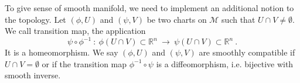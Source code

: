 \documentclass[10pt]{book}
\newcommand{\Mcal}{\mathcal{M}}
\newcommand{\Rbb}{\mathbb{R}}
\theoremstyle{break}
\begin{document}
%
%
%
%
%
%
%
%
%
%
%
%
%
%
%
%
%
%
\bigskip


To give sense of smooth manifold, we need to implement an additional notion to the topology. Let $(\phi,U)$ and $(\psi,V)$ be two charts on $\Mcal$ such that $U \cap V \neq \emptyset$. We call transition map, the application
%
\begin{equation*}
\psi \circ \phi^{-1} \ : \ \phi(U \cap V) \subset \Rbb^n \ \to \ \psi(U \cap V) \subset \Rbb^n \ .
\end{equation*}
%
It is a homeomorphism. We say $(\phi,U)$ and $(\psi,V)$ are smoothly compatible if $U \cap V = \emptyset$ or if the transition map $\phi^{-1} \circ \psi$ is a diffeomorphism, i.e. bijective with smooth inverse.
\end{document}
